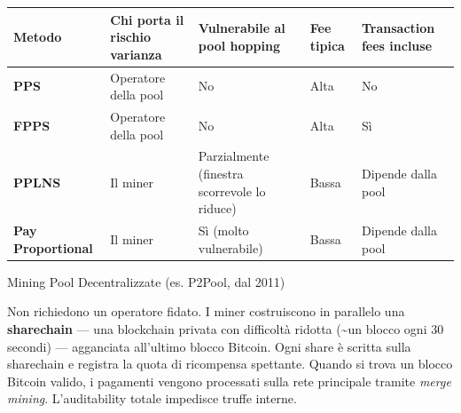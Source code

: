 \documentclass[
  italian,
  openany]{book}
\newcounter{none} %
\begin{document}
{\def\LTcaptype{none} %
\begin{longtable}[]{@{}
  >{\raggedright\arraybackslash}p{}
  >{\raggedright\arraybackslash}p{}
  >{\raggedright\arraybackslash}p{}
  >{\raggedright\arraybackslash}p{}
  >{\raggedright\arraybackslash}p{}@{}}
\toprule\noalign{}
\begin{minipage}[b]{\linewidth}\raggedright
Metodo
\end{minipage} & \begin{minipage}[b]{\linewidth}\raggedright
Chi porta il rischio varianza
\end{minipage} & \begin{minipage}[b]{\linewidth}\raggedright
Vulnerabile al pool hopping
\end{minipage} & \begin{minipage}[b]{\linewidth}\raggedright
Fee tipica
\end{minipage} & \begin{minipage}[b]{\linewidth}\raggedright
Transaction fees incluse
\end{minipage} \\
\midrule\noalign{}
\endhead
\bottomrule\noalign{}
\endlastfoot
\textbf{PPS} & Operatore della pool & No & Alta & No \\
\textbf{FPPS} & Operatore della pool & No & Alta & Sì \\
\textbf{PPLNS} & Il miner & Parzialmente (finestra scorrevole lo riduce)
& Bassa & Dipende dalla pool \\
\textbf{Pay Proportional} & Il miner & Sì (molto vulnerabile) & Bassa &
Dipende dalla pool \\
\end{longtable}
}

\begin{calloutwarning}{Mining Pool Decentralizzate (es. P2Pool, dal 2011)}

Non richiedono un operatore fidato. I miner costruiscono in parallelo
una \textbf{sharechain} --- una blockchain privata con difficoltà
ridotta (\textasciitilde un blocco ogni 30 secondi) --- agganciata
all'ultimo blocco Bitcoin. Ogni share è scritta sulla sharechain e
registra la quota di ricompensa spettante. Quando si trova un blocco
Bitcoin valido, i pagamenti vengono processati sulla rete principale
tramite \emph{merge mining}. L'auditability totale impedisce truffe
interne.

\end{calloutwarning}
\end{document}
